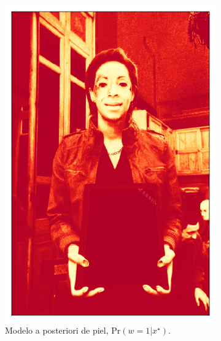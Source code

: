\begin{figure}[ht!]
\begin{subfigure}[t]{0.2\textwidth}
        \includegraphics[width=\textwidth]{../figures/image2/image_02_postskin.png}
        \caption{Modelo a posteriori de piel, $\text{Pr}(w=1 | x^{\star})$.}
    \end{subfigure}
    \hspace{0.25cm}
    \begin{subfigure}[t]{0.2\textwidth}
        \centering

\end{subfigure}
\end{figure}
